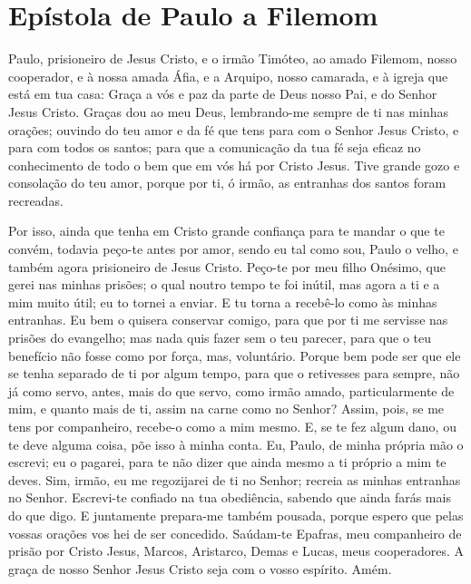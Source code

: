 \thispagestyle{empty}
\chapter*{Epístola de Paulo a Filemom}

Paulo, prisioneiro de Jesus Cristo, e o irmão Timóteo, ao amado
Filemom, nosso cooperador, e à nossa amada Áfia, e a Arquipo,
nosso camarada, e à igreja que está em tua casa: Graça a vós e
paz da parte de Deus nosso Pai, e do Senhor Jesus Cristo. Graças
dou ao meu Deus, lembrando-me sempre de ti nas minhas orações;
ouvindo do teu amor e da fé que tens para com o Senhor Jesus
Cristo, e para com todos os santos; para que a comunicação da
tua fé seja eficaz no conhecimento de todo o bem que em vós há por
Cristo Jesus. Tive grande gozo e consolação do teu amor, porque
por ti, ó irmão, as entranhas dos santos foram recreadas.

Por isso, ainda que tenha em Cristo grande confiança para te
mandar o que te convém, todavia peço-te antes por amor, sendo eu
tal como sou, Paulo o velho, e também agora prisioneiro de Jesus
Cristo. Peço-te por meu filho Onésimo, que gerei nas minhas
prisões; o qual noutro tempo te foi inútil, mas agora a ti e
a mim muito útil; eu to tornei a enviar. E tu torna a
recebê-lo como às minhas entranhas. Eu bem o quisera
conservar comigo, para que por ti me servisse nas prisões do
evangelho; mas nada quis fazer sem o teu parecer, para que o
teu benefício não fosse como por força, mas, voluntário.
Porque bem pode ser que ele se tenha separado de ti por algum
tempo, para que o retivesses para sempre, não já como servo,
antes, mais do que servo, como irmão amado, particularmente de mim,
e quanto mais de ti, assim na carne como no Senhor? Assim,
pois, se me tens por companheiro, recebe-o como a mim mesmo.
E, se te fez algum dano, ou te deve alguma coisa, põe isso à
minha conta. Eu, Paulo, de minha própria mão o escrevi; eu o
pagarei, para te não dizer que ainda mesmo a ti próprio a mim te
deves. Sim, irmão, eu me regozijarei de ti no Senhor; recreia
as minhas entranhas no Senhor. Escrevi-te confiado na tua
obediência, sabendo que ainda farás mais do que digo. E
juntamente prepara-me também pousada, porque espero que pelas vossas
orações vos hei de ser concedido. Saúdam-te Epafras, meu
companheiro de prisão por Cristo Jesus, Marcos, Aristarco,
Demas e Lucas, meus cooperadores. A graça de nosso Senhor
Jesus Cristo seja com o vosso espírito. Amém.
